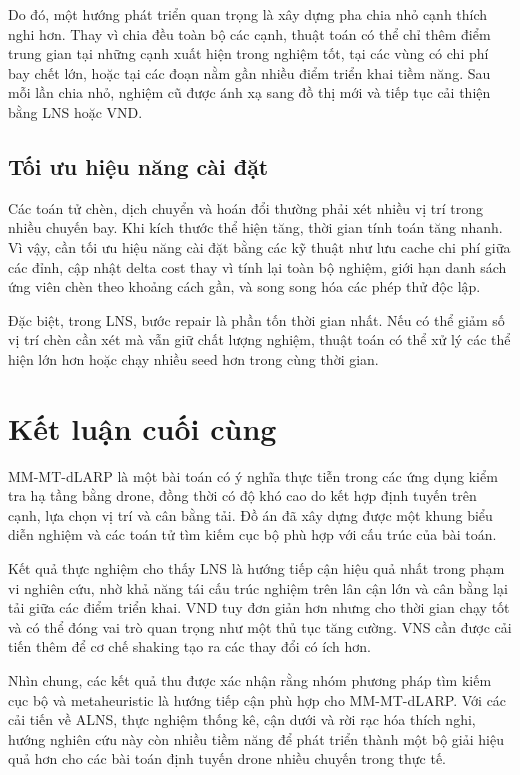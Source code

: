 Do đó, một hướng phát triển quan trọng là xây dựng pha chia nhỏ cạnh thích nghi hơn. Thay vì chia đều toàn bộ các cạnh, thuật toán có thể chỉ thêm điểm trung gian tại những cạnh xuất hiện trong nghiệm tốt, tại các vùng có chi phí bay chết lớn, hoặc tại các đoạn nằm gần nhiều điểm triển khai tiềm năng. Sau mỗi lần chia nhỏ, nghiệm cũ được ánh xạ sang đồ thị mới và tiếp tục cải thiện bằng LNS hoặc VND.

\subsection{Tối ưu hiệu năng cài đặt}
\label{subsec:future-implementation}

Các toán tử chèn, dịch chuyển và hoán đổi thường phải xét nhiều vị trí trong nhiều chuyến bay. Khi kích thước thể hiện tăng, thời gian tính toán tăng nhanh. Vì vậy, cần tối ưu hiệu năng cài đặt bằng các kỹ thuật như lưu cache chi phí giữa các đỉnh, cập nhật delta cost thay vì tính lại toàn bộ nghiệm, giới hạn danh sách ứng viên chèn theo khoảng cách gần, và song song hóa các phép thử độc lập.

Đặc biệt, trong LNS, bước repair là phần tốn thời gian nhất. Nếu có thể giảm số vị trí chèn cần xét mà vẫn giữ chất lượng nghiệm, thuật toán có thể xử lý các thể hiện lớn hơn hoặc chạy nhiều seed hơn trong cùng thời gian.

\section{Kết luận cuối cùng}
\label{sec:final-conclusion}

MM-MT-dLARP là một bài toán có ý nghĩa thực tiễn trong các ứng dụng kiểm tra hạ tầng bằng drone, đồng thời có độ khó cao do kết hợp định tuyến trên cạnh, lựa chọn vị trí và cân bằng tải. Đồ án đã xây dựng được một khung biểu diễn nghiệm và các toán tử tìm kiếm cục bộ phù hợp với cấu trúc của bài toán.

Kết quả thực nghiệm cho thấy LNS là hướng tiếp cận hiệu quả nhất trong phạm vi nghiên cứu, nhờ khả năng tái cấu trúc nghiệm trên lân cận lớn và cân bằng lại tải giữa các điểm triển khai. VND tuy đơn giản hơn nhưng cho thời gian chạy tốt và có thể đóng vai trò quan trọng như một thủ tục tăng cường. VNS cần được cải tiến thêm để cơ chế shaking tạo ra các thay đổi có ích hơn.

Nhìn chung, các kết quả thu được xác nhận rằng nhóm phương pháp tìm kiếm cục bộ và metaheuristic là hướng tiếp cận phù hợp cho MM-MT-dLARP. Với các cải tiến về ALNS, thực nghiệm thống kê, cận dưới và rời rạc hóa thích nghi, hướng nghiên cứu này còn nhiều tiềm năng để phát triển thành một bộ giải hiệu quả hơn cho các bài toán định tuyến drone nhiều chuyến trong thực tế.
